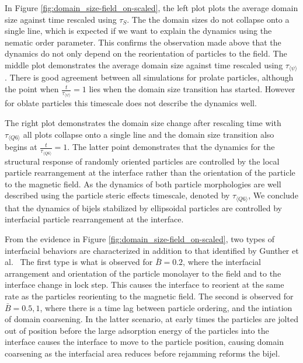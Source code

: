 In Figure \ref{fig:domain_size-field_on-scaled}, the left plot plots the
average domain size against time rescaled using $\tau_S$. The
the domain sizes do not collapse onto a single line, which is expected
if we want to explain the dynamics using the nematic order parameter.
This confirms the observation made above that the dynamics do not only
depend on the reorientation of particles to the field. The middle plot
demonstrates the average domain size against time rescaled using
$\tau_{\langle \psi \rangle}$. There is good agreement
between all simulations for prolate particles, although the point when
$\frac{t}{\tau_{\langle \psi \rangle}} = 1$ lies when the domain size
transition has started. However for oblate particles this
timescale does not describe the dynamics well.

The right plot demonstrates the domain size change after rescaling time
with $\tau_{\langle Q6 \rangle}$ all plots collapse onto a single line and 
the domain size transition also begins at
$\frac{t}{\tau_{\langle Q6 \rangle}} = 1$. The latter point
demonstrates that the dynamics for the structural response of randomly
oriented particles are controlled by the local particle rearrangement at
the interface rather than the orientation of the particle to the
magnetic field. As the dynamics of both particle morphologies are well described
using the particle steric effects timescale, denoted by $\tau_{\langle Q6 \rangle}$,
We conclude that the dynamics of bijels stabilized by ellipsoidal particles are controlled by
interfacial particle rearrangement at the interface.

From the evidence in Figure \ref{fig:domain_size-field_on-scaled}, two
types of interfacial behaviors are characterized in addition to that
identified by Gunther et al.~\cite{gunther_timescales_2014} The first
type is what is observed for $\bar{B} = 0.2$, where the interfacial
arrangement and orientation of the particle monolayer to the field and to the
interface change in lock step. This causes the interface to reorient at
the same rate as the particles reorienting to the magnetic field. The
second is observed for $\bar{B} = 0.5, 1$, where there is a time lag
between particle ordering, and the intiation of domain coarsening. In
the latter scenario, at early times the particles are jolted out of
position before the large adsorption energy of the particles into the
interface causes the interface to move to the particle position, causing
domain coarsening as the interfacial area reduces before rejamming reforms the bijel.

